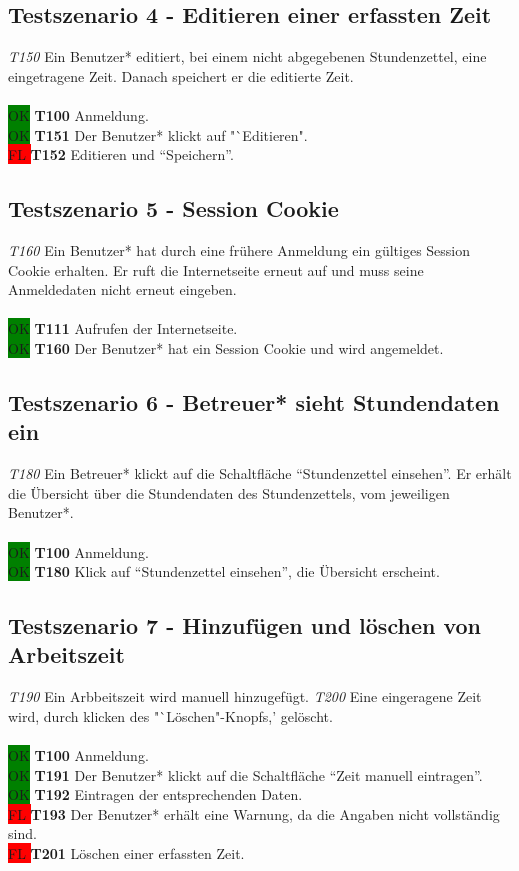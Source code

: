 \subsection{Testszenario 4 - Editieren einer erfassten Zeit}
\emph{T150} Ein Benutzer* editiert, bei einem nicht abgegebenen Stundenzettel, eine eingetragene Zeit. Danach speichert er die editierte Zeit.
\\\\
\colorbox{green}{OK} \textbf{T100} Anmeldung. \\
\colorbox{green}{OK} \textbf{T151} Der Benutzer* klickt auf "`Editieren". \\
\colorbox{red}{FL } \textbf{T152} Editieren und "`Speichern"'.

\subsection{Testszenario 5 - Session Cookie}
\emph{T160} Ein Benutzer* hat durch eine frühere Anmeldung ein gültiges Session Cookie erhalten. Er ruft die Internetseite erneut auf und muss seine Anmeldedaten nicht erneut eingeben.
\\\\
\colorbox{green}{OK} \textbf{T111} Aufrufen der Internetseite. \\
\colorbox{green}{OK} \textbf{T160} Der Benutzer* hat ein Session Cookie und wird angemeldet.

\subsection{Testszenario 6 - Betreuer* sieht Stundendaten ein}
\emph{T180} Ein Betreuer* klickt auf die Schaltfläche "`Stundenzettel einsehen"'. Er erhält die Übersicht über die Stundendaten des Stundenzettels, vom jeweiligen Benutzer*.
\\\\
\colorbox{green}{OK} \textbf{T100} Anmeldung. \\
\colorbox{green}{OK} \textbf{T180} Klick auf "`Stundenzettel einsehen"', die Übersicht erscheint.

\subsection{Testszenario 7 - Hinzufügen und löschen von Arbeitszeit}
\emph{T190} Ein Arbbeitszeit wird manuell hinzugefügt. \emph{T200} Eine eingeragene Zeit wird, durch klicken des "`Löschen"-Knopfs,' gelöscht.
\\\\
\colorbox{green}{OK} \textbf{T100} Anmeldung. \\
\colorbox{green}{OK} \textbf{T191} Der Benutzer* klickt auf die Schaltfläche "`Zeit manuell eintragen"'. \\
\colorbox{green}{OK} \textbf{T192} Eintragen der entsprechenden Daten. \\
\colorbox{red}{FL } \textbf{T193} Der Benutzer* erhält eine Warnung, da die Angaben nicht vollständig sind. \\
\colorbox{red}{FL } \textbf{T201} Löschen einer erfassten Zeit.

